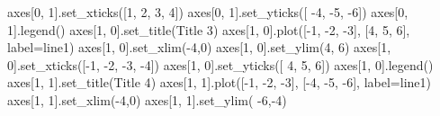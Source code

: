 \documentclass[
  letterpaper,
]{article}
\newenvironment{Shaded}{\begin{snugshade}}{\end{snugshade}}
\newcommand{\DecValTok}[1]{\textcolor[rgb]{0.68,0.00,0.00}{#1}}
\newcommand{\NormalTok}[1]{\textcolor[rgb]{0.00,0.23,0.31}{#1}}
\newcommand{\OperatorTok}[1]{\textcolor[rgb]{0.37,0.37,0.37}{#1}}
\newcommand{\StringTok}[1]{\textcolor[rgb]{0.13,0.47,0.30}{#1}}
\begin{document}
\begin{Shaded}
\begin{Highlighting}[]
\NormalTok{axes[}\DecValTok{0}\NormalTok{, }\DecValTok{1}\NormalTok{].set\_xticks([}\DecValTok{1}\NormalTok{, }\DecValTok{2}\NormalTok{, }\DecValTok{3}\NormalTok{, }\DecValTok{4}\NormalTok{])}
\NormalTok{axes[}\DecValTok{0}\NormalTok{, }\DecValTok{1}\NormalTok{].set\_yticks([ }\OperatorTok{{-}}\DecValTok{4}\NormalTok{, }\OperatorTok{{-}}\DecValTok{5}\NormalTok{, }\OperatorTok{{-}}\DecValTok{6}\NormalTok{])}
\NormalTok{axes[}\DecValTok{0}\NormalTok{, }\DecValTok{1}\NormalTok{].legend()}
\NormalTok{axes[}\DecValTok{1}\NormalTok{, }\DecValTok{0}\NormalTok{].set\_title(}\StringTok{\textquotesingle{}Title 3\textquotesingle{}}\NormalTok{)}
\NormalTok{axes[}\DecValTok{1}\NormalTok{, }\DecValTok{0}\NormalTok{].plot([}\OperatorTok{{-}}\DecValTok{1}\NormalTok{, }\OperatorTok{{-}}\DecValTok{2}\NormalTok{, }\OperatorTok{{-}}\DecValTok{3}\NormalTok{], [}\DecValTok{4}\NormalTok{, }\DecValTok{5}\NormalTok{, }\DecValTok{6}\NormalTok{], label}\OperatorTok{=}\StringTok{\textquotesingle{}line1\textquotesingle{}}\NormalTok{)}
\NormalTok{axes[}\DecValTok{1}\NormalTok{, }\DecValTok{0}\NormalTok{].set\_xlim(}\OperatorTok{{-}}\DecValTok{4}\NormalTok{,}\DecValTok{0}\NormalTok{)}
\NormalTok{axes[}\DecValTok{1}\NormalTok{, }\DecValTok{0}\NormalTok{].set\_ylim(}\DecValTok{4}\NormalTok{, }\DecValTok{6}\NormalTok{)}
\NormalTok{axes[}\DecValTok{1}\NormalTok{, }\DecValTok{0}\NormalTok{].set\_xticks([}\OperatorTok{{-}}\DecValTok{1}\NormalTok{, }\OperatorTok{{-}}\DecValTok{2}\NormalTok{, }\OperatorTok{{-}}\DecValTok{3}\NormalTok{, }\OperatorTok{{-}}\DecValTok{4}\NormalTok{])}
\NormalTok{axes[}\DecValTok{1}\NormalTok{, }\DecValTok{0}\NormalTok{].set\_yticks([ }\DecValTok{4}\NormalTok{, }\DecValTok{5}\NormalTok{, }\DecValTok{6}\NormalTok{])}
\NormalTok{axes[}\DecValTok{1}\NormalTok{, }\DecValTok{0}\NormalTok{].legend()}
\NormalTok{axes[}\DecValTok{1}\NormalTok{, }\DecValTok{1}\NormalTok{].set\_title(}\StringTok{\textquotesingle{}Title 4\textquotesingle{}}\NormalTok{)}
\NormalTok{axes[}\DecValTok{1}\NormalTok{, }\DecValTok{1}\NormalTok{].plot([}\OperatorTok{{-}}\DecValTok{1}\NormalTok{, }\OperatorTok{{-}}\DecValTok{2}\NormalTok{, }\OperatorTok{{-}}\DecValTok{3}\NormalTok{], [}\OperatorTok{{-}}\DecValTok{4}\NormalTok{, }\OperatorTok{{-}}\DecValTok{5}\NormalTok{, }\OperatorTok{{-}}\DecValTok{6}\NormalTok{], label}\OperatorTok{=}\StringTok{\textquotesingle{}line1\textquotesingle{}}\NormalTok{)}
\NormalTok{axes[}\DecValTok{1}\NormalTok{, }\DecValTok{1}\NormalTok{].set\_xlim(}\OperatorTok{{-}}\DecValTok{4}\NormalTok{,}\DecValTok{0}\NormalTok{)}
\NormalTok{axes[}\DecValTok{1}\NormalTok{, }\DecValTok{1}\NormalTok{].set\_ylim( }\OperatorTok{{-}}\DecValTok{6}\NormalTok{,}\OperatorTok{{-}}\DecValTok{4}\NormalTok{)}

\end{Highlighting}
\end{Shaded}
\end{document}
